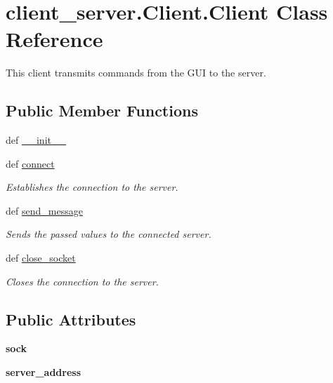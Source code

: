 \hypertarget{classclient__server_1_1Client_1_1Client}{\section{client\+\_\+server.\+Client.\+Client Class Reference}
\label{classclient__server_1_1Client_1_1Client}
}


This client transmits commands from the G\+U\+I to the server.  


\subsection*{Public Member Functions}
\begin{DoxyCompactItemize}
\item 
def \hyperlink{classclient__server_1_1Client_1_1Client_a8cb4c2c473ea08646175c2b74d748f61}{\+\_\+\+\_\+init\+\_\+\+\_\+}
\item 
def \hyperlink{classclient__server_1_1Client_1_1Client_a1b7f816b79f1c40420a38855193a4c4a}{connect}
\begin{DoxyCompactList}\small\item\em Establishes the connection to the server. \end{DoxyCompactList}\item 
def \hyperlink{classclient__server_1_1Client_1_1Client_a9dafb6ebf8664a9b23e85ee425d93601}{send\+\_\+message}
\begin{DoxyCompactList}\small\item\em Sends the passed values to the connected server. \end{DoxyCompactList}\item 
def \hyperlink{classclient__server_1_1Client_1_1Client_a926560513b0d2f136783d4b4b26018b7}{close\+\_\+socket}
\begin{DoxyCompactList}\small\item\em Closes the connection to the server. \end{DoxyCompactList}\end{DoxyCompactItemize}
\subsection*{Public Attributes}
\begin{DoxyCompactItemize}
\item 
\hypertarget{classclient__server_1_1Client_1_1Client_a578c283509dddd4ac22ba9492598083e}{{\bfseries sock}}\label{classclient__server_1_1Client_1_1Client_a578c283509dddd4ac22ba9492598083e}

\item 
\hypertarget{classclient__server_1_1Client_1_1Client_aad76961c6ae3d54749a934be5540115b}{{\bfseries server\+\_\+address}}\label{classclient__server_1_1Client_1_1Client_aad76961c6ae3d54749a934be5540115b}

\end{DoxyCompactItemize}


